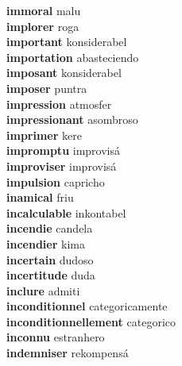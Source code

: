 \textbf{immoral } malu \\
\textbf{implorer } roga \\
\textbf{important } konsiderabel \\
\textbf{importation } abasteciendo \\
\textbf{imposant } konsiderabel \\
\textbf{imposer } puntra \\
\textbf{impression } atmosfer \\
\textbf{impressionant } asombroso \\
\textbf{imprimer } kere \\
\textbf{impromptu } improvisá \\
\textbf{improviser } improvisá \\
\textbf{impulsion } capricho \\
\textbf{inamical } friu \\
\textbf{incalculable } inkontabel \\
\textbf{incendie } candela \\
\textbf{incendier } kima \\
\textbf{incertain } dudoso \\
\textbf{incertitude } duda \\
\textbf{inclure } admiti \\
\textbf{inconditionnel } categoricamente \\
\textbf{inconditionnellement } categorico \\
\textbf{inconnu } estranhero \\
\textbf{indemniser } rekompensá \\
